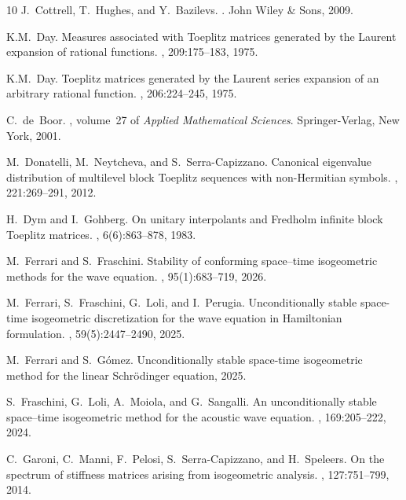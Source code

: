 \documentclass[addpoints,12pt,letter]{article}
\numberwithin{equation}{section}
\theoremstyle{definition}
\begin{document}
\begin{thebibliography}{10}
J.~Cottrell, T.~Hughes, and Y.~Bazilevs.
.
\newblock John Wiley \& Sons, 2009.

{\relax K.M}.~Day.
\newblock Measures associated with {T}oeplitz matrices generated by the {L}aurent expansion of rational functions.
, 209:175--183, 1975.

{\relax K.M}.~Day.
\newblock Toeplitz matrices generated by the {L}aurent series expansion of an arbitrary rational function.
, 206:224--245, 1975.

C.~de~Boor.
, volume~27 of {\em Applied Mathematical Sciences}.
\newblock Springer-Verlag, New York, 2001.

M.~Donatelli, M.~Neytcheva, and S.~Serra-Capizzano.
\newblock Canonical eigenvalue distribution of multilevel block {T}oeplitz sequences with non-{H}ermitian symbols.
, 221:269--291, 2012.

H.~Dym and I.~Gohberg.
\newblock On unitary interpolants and {F}redholm infinite block {T}oeplitz matrices.
, 6(6):863--878, 1983.

M.~Ferrari and S.~Fraschini.
\newblock Stability of conforming space–time isogeometric methods for the wave equation.
, 95(1):683--719, 2026.

M.~Ferrari, S.~Fraschini, G.~Loli, and I.~Perugia.
\newblock Unconditionally stable space-time isogeometric discretization for the wave equation in {H}amiltonian formulation.
, 59(5):2447--2490, 2025.

M.~Ferrari and S.~Gómez.
\newblock Unconditionally stable space-time isogeometric method for the linear {S}chr\"odinger equation, 2025.

S.~Fraschini, G.~Loli, A.~Moiola, and G.~Sangalli.
\newblock An unconditionally stable space–time isogeometric method for the acoustic wave equation.
, 169:205--222, 2024.

C.~Garoni, C.~Manni, F.~Pelosi, S.~Serra-Capizzano, and H.~Speleers.
\newblock On the spectrum of stiffness matrices arising from isogeometric analysis.
, 127:751--799, 2014.


\end{thebibliography}
\end{document}
